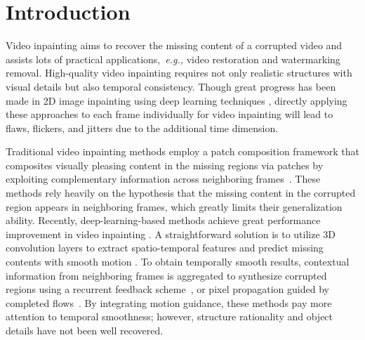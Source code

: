 

\section{Introduction}


Video inpainting aims to recover the missing content of a corrupted video and assists lots of practical applications,~\emph{e.g.,} video restoration and watermarking removal. 
High-quality video inpainting requires not only realistic structures with visual details but also temporal consistency. 
% 
Though great progress has been made in 2D image inpainting using deep learning techniques \cite{yu2018free,Xiong_2019_CVPR,wang2018high}, directly applying these approaches to each frame individually for video inpainting will lead to flaws, flickers, and jitters due to the additional time dimension. 





Traditional video inpainting methods employ a patch composition framework that composites visually pleasing content in the missing regions via patches by exploiting complementary information across neighboring frames~\cite{patwardhan2007video,wexler2004space,tcsvt2009,newson2014video}.
% 
These methods rely heavily on the hypothesis that the missing content in the corrupted region appears in neighboring frames, which greatly limits their generalization ability.
%
Recently, deep-learning-based methods achieve great performance improvement in video inpainting \cite{wang2019video,Kim_2019_CVPR1,Xu_2019_CVPR,Kim_2019_CVPR}.
A straightforward solution is to utilize 3D convolution layers to extract spatio-temporal features and predict missing contents with smooth motion \cite{wang2019video}.
To obtain temporally smooth results, contextual information from neighboring frames is aggregated to synthesize corrupted regions using a recurrent feedback scheme~\cite{Kim_2019_CVPR1,Kim_2019_CVPR}, or pixel propagation guided by completed flows~\cite{Xu_2019_CVPR}. 
By integrating motion guidance, these methods pay more attention to temporal smoothness; however, structure rationality and object details have not been well recovered. 


